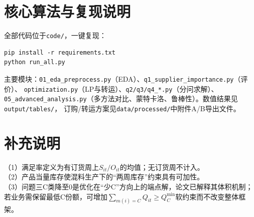 \documentclass[12pt,a4paper]{ctexart}
\begin{document}
\section{核心算法与复现说明}
全部代码位于\texttt{code/}，一键复现：
\begin{verbatim}
pip install -r requirements.txt
python run_all.py
\end{verbatim}
主要模块：\texttt{01\_eda\_preprocess.py}（EDA）、\texttt{q1\_supplier\_importance.py}（评价）、
\texttt{optimization.py}（LP与转运）、\texttt{q2/q3/q4\_*.py}（分问求解）、
\texttt{05\_advanced\_analysis.py}（多方法对比、蒙特卡洛、鲁棒性）。数值结果见\texttt{output/tables/}，
订购/转运方案见\texttt{data/processed/}中附件A/B导出文件。

\section{补充说明}
（1）满足率定义为有订货周上$S_{it}/O_{it}$的均值；无订货周不计入。\\
（2）产品当量库存使混料生产下的“两周库存”约束具有可加性。\\
（3）问题三C类降至0是优化在“少C”方向上的端点解，论文已解释其体积机制；若业务需保留最低C份额，可增加$\sum_{m(i)=C}Q_{it}\ge Q_C^{\min}$软约束而不改变整体框架。
\end{document}
